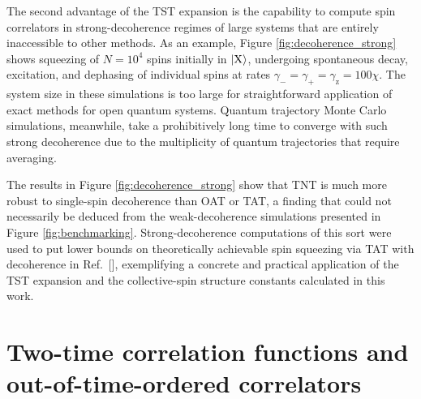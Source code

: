 \documentclass[aps,pra,twocolumn,longbibliography]{revtex4-2}
\newcommand{\z}{\text{z}}
\newcommand{\X}{\text{X}}
\newcommand{\1}{\mathds{1}}
\begin{document}
The second advantage of the TST expansion is the capability to compute
spin correlators in strong-decoherence regimes of large systems that
are entirely inaccessible to other methods.  As an example, Figure
\ref{fig:decoherence_strong} shows squeezing of $N=10^4$ spins
initially in $\ket{\X}$, undergoing spontaneous decay, excitation, and
dephasing of individual spins at rates
$\gamma_-=\gamma_+=\gamma_\z=100\chi$.
%
%
The system size in these simulations is too large for straightforward
application of exact methods for open quantum systems.  Quantum
trajectory Monte Carlo simulations, meanwhile, take a prohibitively
long time to converge with such strong decoherence due to the
multiplicity of quantum trajectories that require averaging.

The results in Figure \ref{fig:decoherence_strong} show that
%
TNT is much more robust to single-spin decoherence than OAT or TAT, a
finding that could not necessarily be deduced from the
weak-decoherence simulations presented in Figure
\ref{fig:benchmarking}.  Strong-decoherence computations of this sort
were used to put lower bounds on theoretically achievable spin
squeezing via TAT with decoherence in
Ref.~[], exemplifying a concrete and
practical application of the TST expansion and the collective-spin
structure constants calculated in this work.


\section{Two-time correlation functions and out-of-time-ordered
  correlators}
\label{sec:multi_time}
\end{document}
